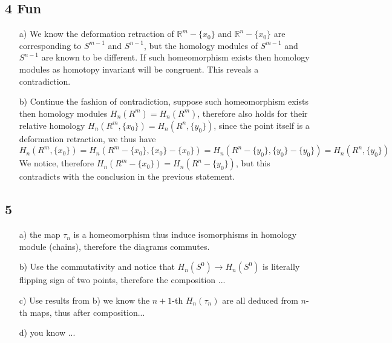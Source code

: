 \documentclass[11pt]{article}
\def\R{{\mathbb R}}
\theoremstyle{remark}
\begin{document}
\subsection*{4 Fun}
\begin{itemize}
    \item [a)] We know the deformation retraction of $\R^m-\{x_0\}$ and $\R^n-\{x_0\}$ are corresponding to $S^{m-1}$ and $S^{n-1}$, but the homology modules of $S^{m-1}$ and $S^{n-1}$ are known to be different. If such homeomorphism exists then homology modules as homotopy invariant will be congruent. This reveals a contradiction.
    
    \item [b)] Continue the fashion of contradiction, suppose such homeomorphism exists then homology modules $H_{n}(R^m)=H_{n}(R^m)$, therefore also holds for their relative homology  $H_{n}(R^m,\{x_0\})=H_{n}(R^n,\{y_0\})$, since the point itself is a deformation retraction, we thus have $$H_{n}(R^m,\{x_0\})=H_{n}(R^m-\{x_0\},\{x_0\}-\{x_0\})=H_{n}(R^n-\{y_0\},\{y_0\}-\{y_0\})=H_{n}(R^n,\{y_0\})$$ 
    We notice, therefore $H_{n}(R^m-\{x_0\})=H_{n}(R^n-\{y_0\})$, but this contradicts with the conclusion in the previous statement.
\end{itemize}


\subsection*{5}
\begin{itemize}
    \item [a)] the map $\tau_n$ is a homeomorphism thus induce isomorphisms in homology module (chains), therefore the diagrams commutes.
    \item[b)] Use the commutativity and notice that $H_{n}(S^0)\rightarrow H_{n}(S^0)$ is literally flipping sign of two points, therefore the composition ...
    \item[c)] Use results from b) we know the $n+1$-th $H_n(\tau_n)$ are all deduced from $n$-th maps, thus after composition...
    \item[d)] you know ... 
\end{itemize}
\end{document}
